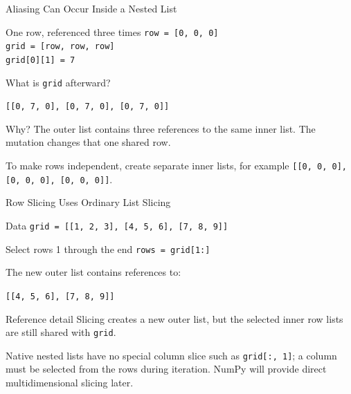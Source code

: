 \documentclass[aspectratio=169,10pt]{beamer}
\begin{document}
\begin{frame}{Aliasing Can Occur Inside a Nested List}
  \begin{block}{One row, referenced three times}
    \texttt{row = [0, 0, 0]}\\
    \texttt{grid = [row, row, row]}\\[0.08in]
    \texttt{grid[0][1] = 7}
  \end{block}

  What is \texttt{grid} afterward?

  \begin{center}
    \Large\texttt{[[0, 7, 0], [0, 7, 0], [0, 7, 0]]}
  \end{center}

  \begin{alertblock}{Why?}
    The outer list contains three references to the same inner list. The mutation changes that one shared row.
  \end{alertblock}

  To make rows independent, create separate inner lists, for example \texttt{[[0, 0, 0], [0, 0, 0], [0, 0, 0]]}.
\end{frame}

\begin{frame}{Row Slicing Uses Ordinary List Slicing}
  \begin{block}{Data}
    \texttt{grid = [[1, 2, 3], [4, 5, 6], [7, 8, 9]]}
  \end{block}

  \begin{block}{Select rows 1 through the end}
    \texttt{rows = grid[1:]}
  \end{block}

  The new outer list contains references to:

  \begin{center}
    \texttt{[[4, 5, 6], [7, 8, 9]]}
  \end{center}

  \begin{alertblock}{Reference detail}
    Slicing creates a new outer list, but the selected inner row lists are still shared with \texttt{grid}.
  \end{alertblock}

  Native nested lists have no special column slice such as \texttt{grid[:, 1]}; a column must be selected from the rows during iteration. NumPy will provide direct multidimensional slicing later.
\end{frame}

\end{document}
